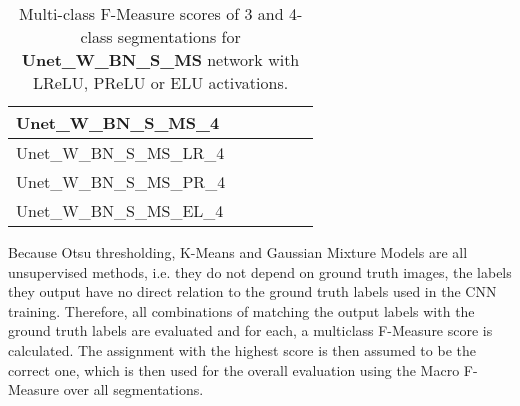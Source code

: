 \begin {table}
\begin{flushleft}
\begin {tabular}[!ht]{|l|l|l|l|l|l|}
			Unet\_W\_BN\_S\_MS\_4& & & & & \\ \hline
			Unet\_W\_BN\_S\_MS\_LR\_4& & & & & \\ \hline
			Unet\_W\_BN\_S\_MS\_PR\_4& & & & & \\ \hline
			Unet\_W\_BN\_S\_MS\_EL\_4& & & & & \\ \hline
		\end {tabular}
	\end {flushleft}
\caption[Multi-class F-Measure scores for networks with different activation functions.]{Multi-class F-Measure scores of 3 and 4-class segmentations for  \textbf{Unet\_W\_BN\_S\_MS} network with LReLU, PReLU or ELU activations.}
\label{tab:results5}
\end {table}


\noindent Because Otsu thresholding, K-Means and Gaussian Mixture Models are all unsupervised methods, i.e. they do not depend on ground truth images, the labels they output have no direct relation to the ground truth labels used in the CNN training. Therefore, all combinations of matching the output labels with the ground truth labels are evaluated and for each, a multiclass F-Measure score is calculated. The assignment with the highest score is then assumed to be the correct one, which is then used for the overall evaluation using the Macro F-Measure over all segmentations.\\


